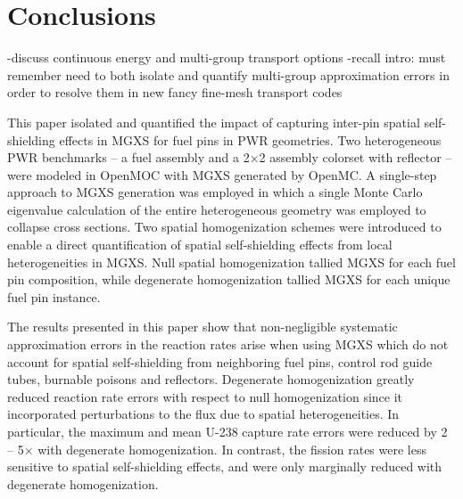 \section{Conclusions}
\label{sec:conclusions}

-discuss continuous energy and multi-group transport options
  -recall intro: must remember need to both isolate and quantify multi-group approximation errors in order to resolve them in new fancy fine-mesh transport codes
  
This paper isolated and quantified the impact of capturing inter-pin spatial self-shielding effects in MGXS for fuel pins in PWR geometries. Two heterogeneous PWR benchmarks -- a fuel assembly and a 2$\times$2 assembly colorset with reflector -- were modeled in OpenMOC with MGXS generated by OpenMC. A single-step approach to MGXS generation was employed in which a single Monte Carlo eigenvalue calculation of the entire heterogeneous geometry was employed to collapse cross sections. Two spatial homogenization schemes were introduced to enable a direct quantification of spatial self-shielding effects from local heterogeneities in MGXS. Null spatial homogenization tallied MGXS for each fuel pin composition, while degenerate homogenization tallied MGXS for each unique fuel pin instance.


The results presented in this paper show that non-negligible systematic approximation errors in the reaction rates arise when using MGXS which do not account for spatial self-shielding from neighboring fuel pins, control rod guide tubes, burnable poisons and reflectors. Degenerate homogenization greatly reduced reaction rate errors with respect to null homogenization since it incorporated perturbations to the flux due to spatial heterogeneities. In particular, the maximum and mean U-238 capture rate errors were reduced by 2 -- 5$\times$ with degenerate homogenization. In contrast, the fission rates were less sensitive to spatial self-shielding effects, and were only marginally reduced with degenerate homogenization.


